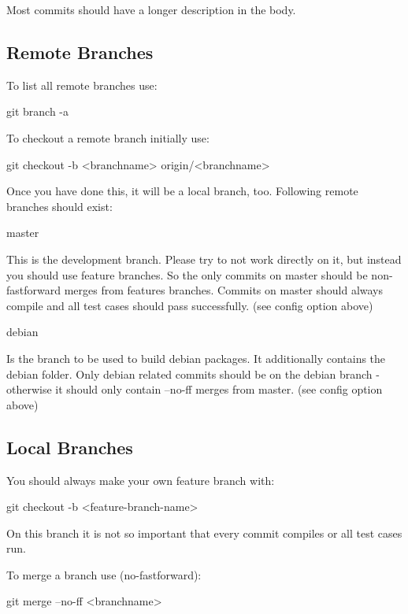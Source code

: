 Most commits should have a longer description in the body.

\subsection*{Remote Branches}

To list all remote branches use\+: \begin{DoxyVerb}    git branch -a
\end{DoxyVerb}


To checkout a remote branch initially use\+: \begin{DoxyVerb}    git checkout -b <branchname> origin/<branchname>
\end{DoxyVerb}


Once you have done this, it will be a local branch, too. Following remote branches should exist\+: \begin{DoxyVerb}    master
\end{DoxyVerb}


This is the development branch. Please try to not work directly on it, but instead you should use feature branches. So the only commits on master should be non-\/fastforward merges from features branches. Commits on master should always compile and all test cases should pass successfully. (see config option above) \begin{DoxyVerb}    debian
\end{DoxyVerb}


Is the branch to be used to build debian packages. It additionally contains the debian folder. Only debian related commits should be on the debian branch -\/ otherwise it should only contain --no-\/ff merges from master. (see config option above)

\subsection*{Local Branches}

You should always make your own feature branch with\+: \begin{DoxyVerb}    git checkout -b <feature-branch-name>
\end{DoxyVerb}


On this branch it is not so important that every commit compiles or all test cases run.

To merge a branch use (no-\/fastforward)\+: \begin{DoxyVerb}    git merge --no-ff <branchname>
\end{DoxyVerb}


